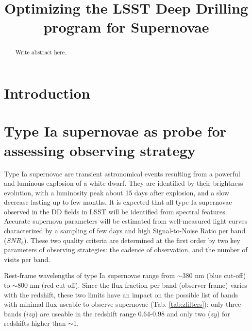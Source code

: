 \documentclass[\docopts]{\docclass}
\newcommand{\snrb}{{$SNR_b$}}
\newcommand{\bi}{{$i$}}
\newcommand{\bz}{{$z$}}
\newcommand{\by}{{$y$}}
\begin{document}
\title{Optimizing the LSST Deep Drilling program for Supernovae}

\maketitlepre

\begin{abstract}

  Write abstract here.

\end{abstract}

\dockeys{}

\maketitlepost


\section{Introduction}
\label{sec:intro}



\section{Type Ia supernovae as probe for assessing observing strategy}
\label{sec:snprobes}
Type Ia supernovae are transient astronomical events resulting from a powerful and luminous explosion of a white dwarf. They are identified by their brightness evolution, with a luminosity peak about 15 days after explosion, and a slow decrease lasting up to few months. It is expected that all type Ia supernovae observed in the DD fields in LSST will be identified from spectral features. Accurate supernova parameters will be estimated from well-measured light curves characterized by a sampling of few days and high Signal-to-Noise Ratio per band (\snrb). These two quality criteria are determined at the first order by two key parameters of observing strategies: the cadence of observation, and the number of visits per band.
\par
Rest-frame wavelengths of type Ia supernovae range from $\sim$380 nm (blue cut-off) to $\sim$800 nm (red cut-off). Since the flux fraction per band (observer frame) varies with the redshift, these two limits have an impact on the possible list of bands with minimal flux useable to observe supernovae (Tab. \ref{tab:zfilters}): only three bands (\bi\bz\by) are useable in the redshift range 0.64-0.98 and only two (\bz\by) for redshifts higher than $\sim$1. 
\end{document}
